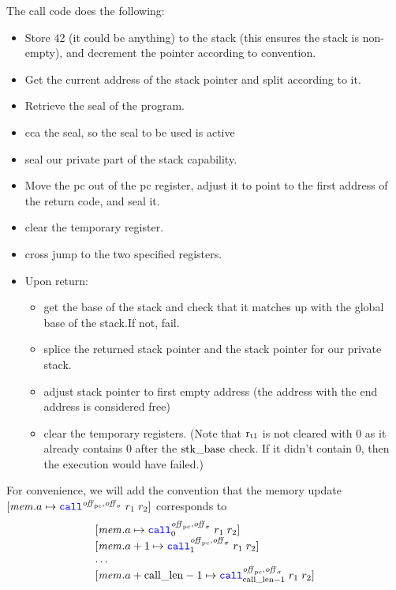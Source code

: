 \documentclass[a4paper]{article}
\begin{document}
The call code does the following:
\begin{itemize}
\item Store 42 (it could be anything) to the stack (this ensures the stack is non-empty), and decrement the pointer according to convention.
\item Get the current address of the stack pointer and split according to it.
\item Retrieve the seal of the program.
\item cca the seal, so the seal to be used is active 
\item seal our private part of the stack capability.
\item Move the pc out of the pc register, adjust it to point to the first address of the return code, and seal it.
\item clear the temporary register.
\item cross jump to the two specified registers.
\item Upon return:
  \begin{itemize}
  \item get the base of the stack and check that it matches up with the global base of the stack.If not, fail.
  \item splice the returned stack pointer and the stack pointer for our private stack.
  \item adjust stack pointer to first empty address (the address with the end address is considered free)  
  \item clear the temporary registers. (Note that $\mathrm{r}_\mathrm{t1}$ is not cleared with 0 as it already contains 0 after the $\mathrm{stk\_base}$ check. If it didn't contain 0, then the execution would have failed.)

  \end{itemize}
\end{itemize}

For convenience, we will add the convention that the memory update $\update{\mem.a}{\scall{\offpc,\offsigma}{r_1}{r_2}}$ corresponds to
\[
  \begin{array}{l}
    \update{\mem.a}{\scall[0]{\offpc,\offsigma}{r_1}{r_2}}\\
    \update{\mem.a+1}{\scall[1]{\offpc,\offsigma}{r_1}{r_2}}\\
    \dots\\
    \update{\mem.a+\calllen-1}{\scall[\calllen-1]{\offpc,\offsigma}{r_1}{r_2}}\\
  \end{array}
\]
\end{document}
